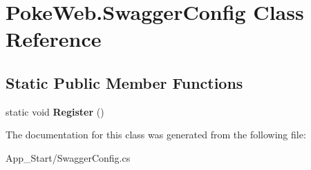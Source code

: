 \hypertarget{class_poke_web_1_1_swagger_config}{}\section{Poke\+Web.\+Swagger\+Config Class Reference}
\label{class_poke_web_1_1_swagger_config}
\subsection*{Static Public Member Functions}
\begin{DoxyCompactItemize}
\item 
\mbox{\label{class_poke_web_1_1_swagger_config_a518fcb5f0f0675bda318488e3919db72}} 
static void {\bfseries Register} ()
\end{DoxyCompactItemize}


The documentation for this class was generated from the following file\+:\begin{DoxyCompactItemize}
\item 
App\+\_\+\+Start/Swagger\+Config.\+cs\end{DoxyCompactItemize}

